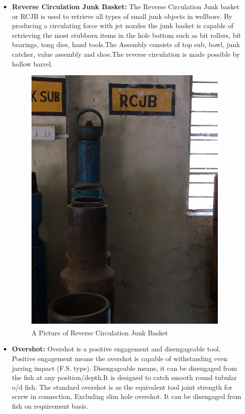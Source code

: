 \begin{itemize}
\item \textbf{Reverse Circulation Junk Basket:} The Reverse Circulation Junk
basket or RCJB is used to retrieve all types of small junk objects in
wellbore. By producing a circulating force with jet nozzles the junk
basket is capable of retrieving the most stubborn items in the hole
bottom such as bit rollers, bit bearings, tong dies, hand tools.The Assembly consists of top sub, bowl, junk catcher, value
assembly and shoe.The reverse circulation is made possible by hollow barrel.

\begin{figure}[h]
\includegraphics[scale=0.3]{images/RJCB}
\centering 
\caption{A Picture of Reverse Circulation Junk Basket}
\end{figure}


\item \textbf{Overshot:} Overshot is a positive engagement and disengageable tool.
Positive engagement means the overshot is capable of withstanding
even jarring impact (F.S. type). Disengageable means, it can be
disengaged from the fish at any position/depth.It is designed to catch smooth round tubular o/d fish.
The standard overshot is as the equivalent tool joint strength for screw in
connection, Excluding slim hole overshot. It can be disengaged
from fish on requirement basis.


\end{itemize}
